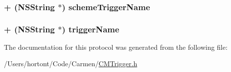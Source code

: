 \hypertarget{protocol_c_m_trigger-p_a49ed0989bec420439226ed5d0c2d156}{
\subsubsection[schemeTriggerName]{\setlength{\rightskip}{0pt plus 5cm}+ ({\bf NSString} $\ast$) schemeTriggerName }}
\label{protocol_c_m_trigger-p_a49ed0989bec420439226ed5d0c2d156}


\hypertarget{protocol_c_m_trigger-p_4e385df4f91b4740541b812938dd8704}{
\subsubsection[triggerName]{\setlength{\rightskip}{0pt plus 5cm}+ ({\bf NSString} $\ast$) triggerName }}
\label{protocol_c_m_trigger-p_4e385df4f91b4740541b812938dd8704}




The documentation for this protocol was generated from the following file:\begin{CompactItemize}
\item 
/Users/hortont/Code/Carmen/\hyperlink{_c_m_trigger_8h}{CMTrigger.h}\end{CompactItemize}
